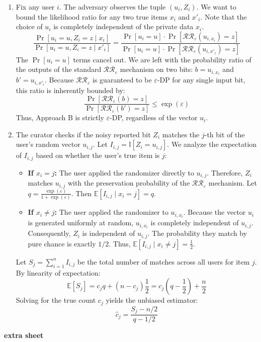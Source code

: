 \documentclass[12pt]{article}
\begin{document}
\begin{enumerate}
\begin{solution}
\begin{enumerate}
\item[(d)] 
Fix any user $i$. The adversary observes the tuple $(u_i, Z_i)$. We want to bound the likelihood ratio for any two true items $x_i$ and $x'_i$. Note that the choice of $u_i$ is completely independent of the private data $x_i$.
\[
\frac{\Pr[u_i = u, Z_i = z \mid x_i]}{\Pr[u_i = u, Z_i = z \mid x'_i]} = \frac{\Pr[u_i = u] \cdot \Pr[\mathcal{R}\mathcal{R}_\varepsilon(u_{i, x_i}) = z]}{\Pr[u_i = u] \cdot \Pr[\mathcal{R}\mathcal{R}_\varepsilon(u_{i, x'_i}) = z]}
\]
The $\Pr[u_i = u]$ terms cancel out. We are left with the probability ratio of the outputs of the standard $\mathcal{R}\mathcal{R}_\varepsilon$ mechanism on two bits: $b = u_{i, x_i}$ and $b' = u_{i, x'_i}$. Because $\mathcal{R}\mathcal{R}_\varepsilon$ is guaranteed to be $\varepsilon$-DP for any single input bit, this ratio is inherently bounded by:
\[
\frac{\Pr[\mathcal{R}\mathcal{R}_\varepsilon(b) = z]}{\Pr[\mathcal{R}\mathcal{R}_\varepsilon(b') = z]} \le \exp(\varepsilon)
\]
Thus, Approach B is strictly $\varepsilon$-DP, regardless of the vector $u_i$.

\item[(e)]
The curator checks if the noisy reported bit $Z_i$ matches the $j$-th bit of the user's random vector $u_{i,j}$. Let $I_{i,j} = \mathbb{I}[Z_i = u_{i,j}]$. We analyze the expectation of $I_{i,j}$ based on whether the user's true item is $j$:
\begin{itemize}
    \item \textbf{If $x_i = j$:} The user applied the randomizer directly to $u_{i,j}$. Therefore, $Z_i$ matches $u_{i,j}$ with the preservation probability of the $\mathcal{R}\mathcal{R}_\varepsilon$ mechanism. Let $q = \frac{\exp(\varepsilon)}{1 + \exp(\varepsilon)}$. Then $\mathbb{E}[I_{i,j} \mid x_i = j] = q$.
    \item \textbf{If $x_i \neq j$:} The user applied the randomizer to $u_{i, x_i}$. Because the vector $u_i$ is generated uniformly at random, $u_{i, x_i}$ is completely independent of $u_{i,j}$. Consequently, $Z_i$ is independent of $u_{i,j}$. The probability they match by pure chance is exactly $1/2$. Thus, $\mathbb{E}[I_{i,j} \mid x_i \neq j] = \frac{1}{2}$.
\end{itemize}
Let $S_j = \sum_{i=1}^n I_{i,j}$ be the total number of matches across all users for item $j$. By linearity of expectation:
\[
\mathbb{E}[S_j] = c_j q + (n - c_j)\frac{1}{2} = c_j\left(q - \frac{1}{2}\right) + \frac{n}{2}
\]
Solving for the true count $c_j$ yields the unbiased estimator:
\[
\hat{c}_j = \frac{S_j - n/2}{q - 1/2}
\]
\end{enumerate}
\end{solution}


\begin{problem}
    \newpage
    {\bf extra sheet}
    \newpage
\end{problem}
\end{enumerate}
\end{document}
